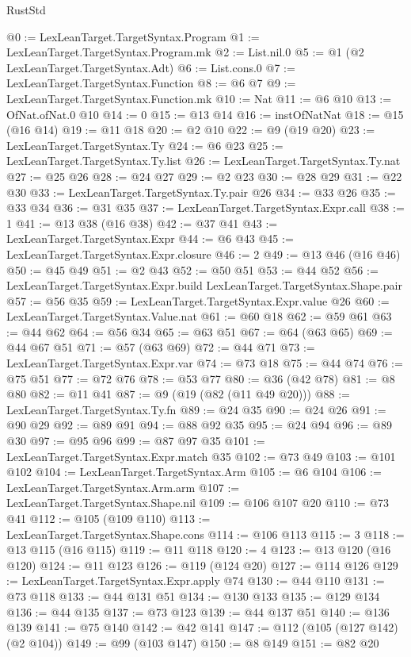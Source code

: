 \begin{lexlean}{RustStd}
\begin{coremodule}
{\begin{coremodule}
{{{{{{{@0 := LexLeanTarget.TargetSyntax.Program
@1 := LexLeanTarget.TargetSyntax.Program.mk
@2 := List.nil.{0}
@5 := @1 (@2 LexLeanTarget.TargetSyntax.Adt)
@6 := List.cons.{0}
@7 := LexLeanTarget.TargetSyntax.Function
@8 := @6 @7
@9 := LexLeanTarget.TargetSyntax.Function.mk
@10 := Nat
@11 := @6 @10
@13 := OfNat.ofNat.{0} @10
@14 := 0
@15 := @13 @14
@16 := instOfNatNat
@18 := @15 (@16 @14)
@19 := @11 @18
@20 := @2 @10
@22 := @9 (@19 @20)
@23 := LexLeanTarget.TargetSyntax.Ty
@24 := @6 @23
@25 := LexLeanTarget.TargetSyntax.Ty.list
@26 := LexLeanTarget.TargetSyntax.Ty.nat
@27 := @25 @26
@28 := @24 @27
@29 := @2 @23
@30 := @28 @29
@31 := @22 @30
@33 := LexLeanTarget.TargetSyntax.Ty.pair @26
@34 := @33 @26
@35 := @33 @34
@36 := @31 @35
@37 := LexLeanTarget.TargetSyntax.Expr.call
@38 := 1
@41 := @13 @38 (@16 @38)
@42 := @37 @41
@43 := LexLeanTarget.TargetSyntax.Expr
@44 := @6 @43
@45 := LexLeanTarget.TargetSyntax.Expr.closure
@46 := 2
@49 := @13 @46 (@16 @46)
@50 := @45 @49
@51 := @2 @43
@52 := @50 @51
@53 := @44 @52
@56 := LexLeanTarget.TargetSyntax.Expr.build LexLeanTarget.TargetSyntax.Shape.pair
@57 := @56 @35
@59 := LexLeanTarget.TargetSyntax.Expr.value @26
@60 := LexLeanTarget.TargetSyntax.Value.nat
@61 := @60 @18
@62 := @59 @61
@63 := @44 @62
@64 := @56 @34
@65 := @63 @51
@67 := @64 (@63 @65)
@69 := @44 @67 @51
@71 := @57 (@63 @69)
@72 := @44 @71
@73 := LexLeanTarget.TargetSyntax.Expr.var
@74 := @73 @18
@75 := @44 @74
@76 := @75 @51
@77 := @72 @76
@78 := @53 @77
@80 := @36 (@42 @78)
@81 := @8 @80
@82 := @11 @41
@87 := @9 (@19 (@82 (@11 @49 @20)))
@88 := LexLeanTarget.TargetSyntax.Ty.fn
@89 := @24 @35
@90 := @24 @26
@91 := @90 @29
@92 := @89 @91
@94 := @88 @92 @35
@95 := @24 @94
@96 := @89 @30
@97 := @95 @96
@99 := @87 @97 @35
@101 := LexLeanTarget.TargetSyntax.Expr.match @35
@102 := @73 @49
@103 := @101 @102
@104 := LexLeanTarget.TargetSyntax.Arm
@105 := @6 @104
@106 := LexLeanTarget.TargetSyntax.Arm.arm
@107 := LexLeanTarget.TargetSyntax.Shape.nil
@109 := @106 @107 @20
@110 := @73 @41
@112 := @105 (@109 @110)
@113 := LexLeanTarget.TargetSyntax.Shape.cons
@114 := @106 @113
@115 := 3
@118 := @13 @115 (@16 @115)
@119 := @11 @118
@120 := 4
@123 := @13 @120 (@16 @120)
@124 := @11 @123
@126 := @119 (@124 @20)
@127 := @114 @126
@129 := LexLeanTarget.TargetSyntax.Expr.apply @74
@130 := @44 @110
@131 := @73 @118
@133 := @44 @131 @51
@134 := @130 @133
@135 := @129 @134
@136 := @44 @135
@137 := @73 @123
@139 := @44 @137 @51
@140 := @136 @139
@141 := @75 @140
@142 := @42 @141
@147 := @112 (@105 (@127 @142) (@2 @104))
@149 := @99 (@103 @147)
@150 := @8 @149
@151 := @82 @20
}}}}}}}
\end{coremodule}}
\end{coremodule}
\end{lexlean}
